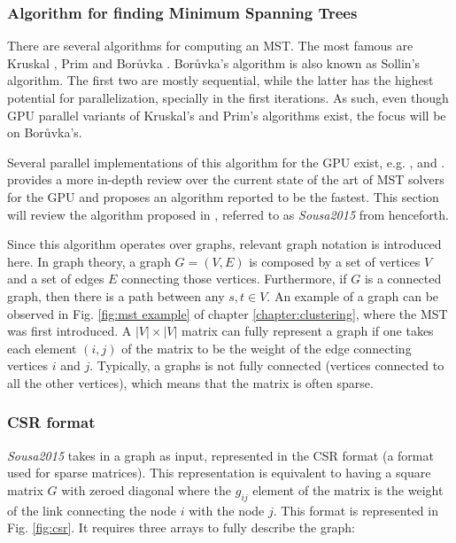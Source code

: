\subsubsection{Algorithm for finding Minimum Spanning Trees}
There are several algorithms for computing an MST.
The most famous are Kruskal \citep{kruskal1956shortest}, Prim \citep{prim1957shortest} and Borůvka \citep{boruuvka1926jistem}.
Borůvka's algorithm is also known as Sollin's algorithm.
The first two are mostly sequential, while the latter has the highest potential for parallelization, specially in the first iterations.
As such, even though GPU parallel variants of Kruskal's \citep{rostrup2013fast} and Prim's \citep{Wang2011} algorithms exist, the focus will be on Borůvka's.%

Several parallel implementations of this algorithm for the GPU exist, e.g. \citep{Vineet2009}, \cite{harish2009large} and \citep{Sousa2015}. \citet{Sousa2015} provides a more in-depth review over the current state of the art of MST solvers for the GPU and proposes an algorithm reported to be the fastest.
This section will review the algorithm proposed in \citep{Sousa2015}, referred to as \emph{Sousa2015} from henceforth.

Since this algorithm operates over graphs, relevant graph notation is introduced here.
In graph theory, a graph $G = (V,E)$ is composed by a set of vertices $V$ and a set of edges $E$ connecting those vertices.
Furthermore, if $G$ is a connected graph, then there is a path between any $s,t \in V$.
An example of a graph can be observed in Fig. \ref{fig:mst example} of chapter \ref{chapter:clustering}, where the MST was first introduced.
A $|V| \times |V|$ matrix can fully represent a graph if one takes each element $(i,j)$ of the matrix to be the weight of the edge connecting vertices $i$ and $j$.
Typically, a graphs is not fully connected (vertices connected to all the other vertices), which means that the matrix is often sparse.

\subsubsection{CSR format}
\emph{Sousa2015} takes in a graph as input, represented in the CSR format (a format used for sparse matrices).
This representation is equivalent to having a square matrix $G$ with zeroed diagonal where the $g_{ij}$ element of the matrix is the weight of the link connecting the node $i$ with the node $j$.
This format is represented in Fig. \ref{fig:csr}.
It requires three arrays to fully describe the graph:

